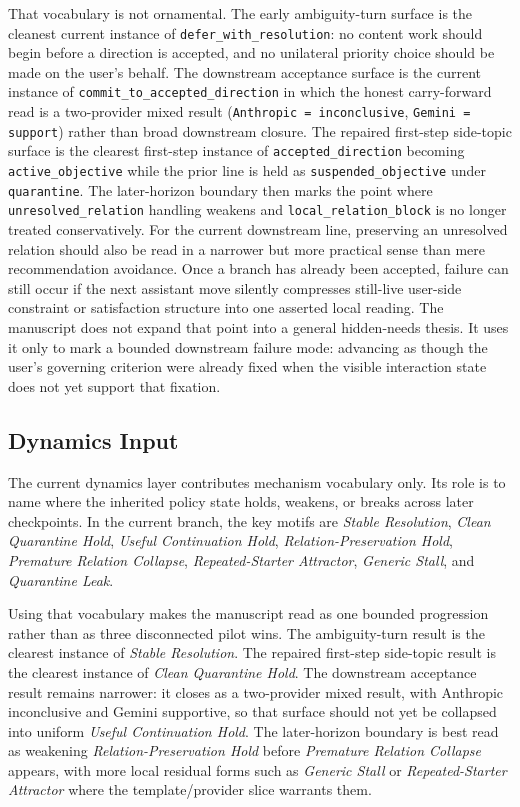 \documentclass[11pt]{article}
\begin{document}
That vocabulary is not ornamental. The early ambiguity-turn surface is the
cleanest current instance of \texttt{defer\_with\_resolution}: no content work
should begin before a direction is accepted, and no unilateral priority choice
should be made on the user's behalf. The downstream acceptance surface is the
current instance of \texttt{commit\_to\_accepted\_direction} in which the
honest carry-forward read is a two-provider mixed result
(\texttt{Anthropic = inconclusive}, \texttt{Gemini = support}) rather than
broad downstream closure. The
repaired first-step side-topic surface is the clearest
first-step instance of \texttt{accepted\_direction} becoming
\texttt{active\_objective} while the prior line is held as
\texttt{suspended\_objective} under \texttt{quarantine}. The later-horizon
boundary then marks the point where \texttt{unresolved\_relation} handling
weakens and \texttt{local\_relation\_block} is no longer treated conservatively.
For the current downstream line, preserving an unresolved relation should also
be read in a narrower but more practical sense than mere recommendation
avoidance. Once a branch has already been accepted, failure can still occur if
the next assistant move silently compresses still-live user-side constraint or
satisfaction structure into one asserted local reading. The manuscript does not
expand that point into a general hidden-needs thesis. It uses it only to mark a
bounded downstream failure mode: advancing as though the user's governing
criterion were already fixed when the visible interaction state does not yet
support that fixation.

\subsection{Dynamics Input}

The current dynamics layer contributes mechanism vocabulary only. Its role is to
name where the inherited policy state holds, weakens, or breaks across later
checkpoints. In the current branch, the key motifs are \textit{Stable
Resolution}, \textit{Clean Quarantine Hold}, \textit{Useful Continuation Hold},
\textit{Relation-Preservation Hold}, \textit{Premature Relation Collapse},
\textit{Repeated-Starter Attractor}, \textit{Generic Stall}, and
\textit{Quarantine Leak}.

Using that vocabulary makes the manuscript read as one bounded progression rather
than as three disconnected pilot wins. The ambiguity-turn result is the clearest
instance of \textit{Stable Resolution}. The repaired first-step side-topic result
is the clearest instance of \textit{Clean Quarantine Hold}. The downstream
acceptance result remains narrower: it closes as a two-provider mixed result,
with Anthropic inconclusive and Gemini supportive, so that surface should not
yet be collapsed into uniform \textit{Useful Continuation Hold}. The later-horizon
boundary is best read as weakening \textit{Relation-Preservation Hold} before
\textit{Premature Relation Collapse} appears, with more local residual forms such
as \textit{Generic Stall} or \textit{Repeated-Starter Attractor} where the
template/provider slice warrants them.
\end{document}
